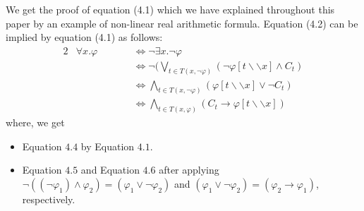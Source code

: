 We get the proof of equation (4.1) which we have explained throughout this paper by an example of non-linear real arithmetic formula. Equation (4.2) can be implied by equation (4.1) as follows:
\begin{alignat}{2}
	& \forall x. \varphi\qquad   
	&&\stackrel{}{\Longleftrightarrow} \neg\exists x.\neg\varphi \\
	& 
	&&\stackrel{}{\Longleftrightarrow} \neg(\bigvee\limits_{t\in T(x,\neg \varphi)}
	 (\neg\varphi [t\backslash\backslash x] \wedge C_t) \\
	& 
	&&\stackrel{}{\Longleftrightarrow} \bigwedge\limits_{t\in T(x,\neg \varphi)} (\varphi [t\backslash\backslash x] \vee\neg C_{t}) \\
	& 
	&&\stackrel{}{\Longleftrightarrow}  \bigwedge\limits_{t\in T(x, \varphi)} (C_{t} \rightarrow \varphi [t\backslash\backslash x])
\end{alignat}
where, we get 
\begin{itemize}
	\item Equation $4.4$ by Equation $4.1$.
	\item Equation $4.5$ and Equation $4.6$ after applying $\neg((\neg\varphi_{1})\wedge\varphi_{2})=(\varphi_{1} \vee \neg\varphi_{2})$ and $(\varphi_{1} \vee \neg\varphi_{2})=(\varphi_{2} \rightarrow \varphi_{1})$, respectively.
\end{itemize}